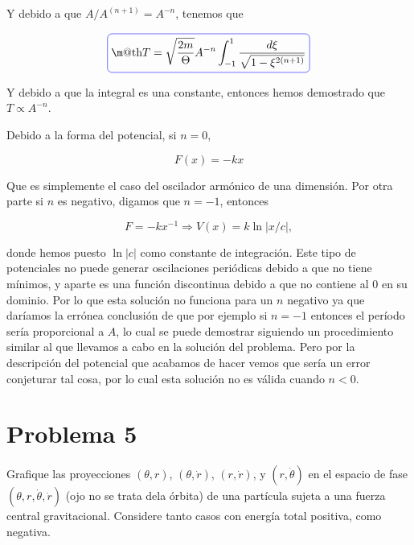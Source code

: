 \documentclass[a4paper,10pt]{article}
\makeatletter
\numberwithin{equation}{section}
\newcommand*{\boxcolor}{blue}
\renewcommand{\boxed}[1]{\textcolor{\boxcolor}{%
\tikz[baseline={([yshift=-1ex]current bounding box.center)}] \node [rectangle, minimum width=1ex,rounded corners,draw] {\normalcolor\m@th$\displaystyle#1$};}}
\makeatother
\begin{document}
Y debido a que $A/A^{(n+1)} = A^{-n}$, tenemos que 

\begin{equation}
 \boxed{T = \sqrt{\frac{2m}{\Theta}} A^{-n} \int_{-1}^1 \frac{d\xi}{\sqrt{1-\xi^{2(n+1)}}}}
\end{equation}

Y debido a que la integral es una constante, entonces hemos demostrado que $T \propto A^{-n}$.

\vspace{.3cm}

Debido a la forma del potencial, si $n=0$,

\begin{equation}
 F(x) = -k x
\end{equation}

Que es simplemente el caso del oscilador armónico de una dimensión. Por otra parte si 
$n$ es negativo, digamos que $n=-1$, entonces 

\begin{equation}
 F = - k x^{-1} \Rightarrow V(x) = k \ln{|x/c|},
\end{equation}

donde hemos puesto $\ln{|c|}$ como constante de integración. Este tipo de potenciales
no puede generar oscilaciones periódicas debido a que no tiene mínimos, y aparte 
es una función discontinua debido a que no contiene al 0 en su dominio. Por lo que 
esta solución no funciona para un $n$ negativo ya que daríamos la errónea conclusión de
que por ejemplo si $n=-1$ entonces el período sería proporcional a $A$, lo cual se 
puede demostrar siguiendo un procedimiento similar al que llevamos a cabo en la solución 
del problema. Pero por la descripción del potencial que acabamos de hacer vemos que 
sería un error conjeturar tal cosa, por lo cual esta solución no es válida cuando 
$n<0$.







\section{Problema 5}

Grafique las proyecciones $(\theta,r)$, $(\theta,\dot{r})$, $(r,\dot{r})$,
y $(r,\dot{\theta})$ en el espacio de fase $(\theta,r,\dot{\theta},\dot{r})$
(ojo no se trata dela órbita) de una partícula sujeta a una fuerza central 
gravitacional. Considere tanto casos con energía total positiva, como 
negativa.
\end{document}
